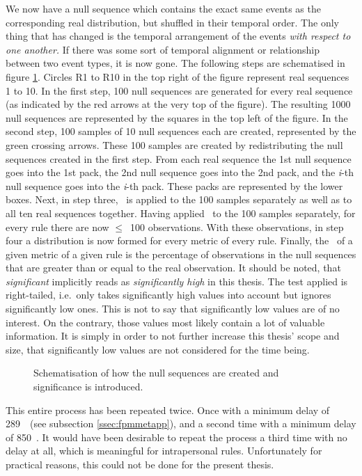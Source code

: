 We now have a null sequence which contains the exact same events as the corresponding real distribution, but shuffled in their temporal order.
The only thing that has changed is the temporal arrangement of the events \emph{with respect to one another.}
If there was some sort of temporal alignment or relationship between two event types, it is now gone.
The following steps are schematised in figure \ref{fig:sig}.
Circles R1 to R10 in the top right of the figure represent real sequences 1 to 10.
In the first step, 100 null sequences are generated for every real sequence (as indicated by the red arrows at the very top of the figure).
The resulting 1000 null sequences are represented by the squares in the top left of the figure.
In the second step, 100 samples of 10 null sequences each are created, represented by the green crossing arrows.
These 100 samples are created by redistributing the null sequences created in the first step.
From each real sequence the 1st null sequence goes into the 1st pack, the 2nd null sequence goes into the 2nd pack, and the \emph{i}-th null sequence goes into the \emph{i}-th pack.
These packs are represented by the lower boxes.
Next, in step three, \fpmlower\ is applied to the 100 samples separately as well as to all ten real sequences together.
Having applied \fpmlower\ to the 100 samples separately, for every rule there are now \(\leq\)~100 observations.
With these observations, in step four a distribution is now formed for every metric of every rule.
Finally, the \pv\ of a given metric of a given rule is the percentage of observations in the null sequences that are greater than or equal to the real observation.
It should be noted, that \emph{significant} implicitly reads as \emph{significantly high} in this thesis.
The test applied is right-tailed, i.e.~only takes significantly high values into account but ignores significantly low ones.
This is not to say that significantly low values are of no interest.
On the contrary, those values most likely contain a lot of valuable information.
It is simply in order to not further increase this thesis' scope and size, that significantly low values are not considered for the time being.

\begin{figure}
	\centering
	
	\label{fig:sig}
	\caption[Introducing significance.]{Schematisation of how the null sequences are created and significance is introduced.}
\end{figure}

This entire process has been repeated twice.
Once with a minimum delay of 289~\ms\ (see subsection \ref{ssec:fpmmetapp}), and a second time with a minimum delay of 850~\ms.
It would have been desirable to repeat the process a third time with no delay at all, which is meaningful for intrapersonal rules.
Unfortunately for practical reasons, this could not be done for the present thesis.

